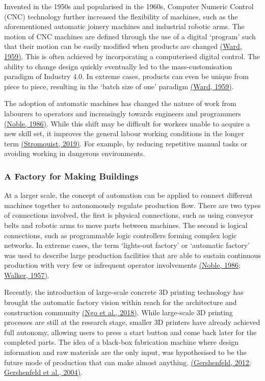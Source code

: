 \documentclass[11pt]{book}
\begin{document}
Invented in the 1950s and popularised in the 1960s, Computer Numeric Control (CNC) technology further increased the flexibility of machines, such as the aforementioned automatic joinery machines and industrial robotic arms. The motion of CNC machines are defined through the use of a digital ‘program’ such that their motion can be easily modified when products are changed \href{https://www.zotero.org/google-docs/?zaXN8V}{(Ward, 1959)}. This is often achieved by incorporating a computerised digital control. The ability to change design quickly eventually led to the mass-customisation paradigm of Industry 4.0. In extreme cases, products can even be unique from piece to piece, resulting in the ‘batch size of one’ paradigm \href{https://www.zotero.org/google-docs/?zgkMNk}{(Ward, 1959)}.

The adoption of automatic machines has changed the nature of work from labourers to operators and increasingly towards engineers and programmers \href{https://www.zotero.org/google-docs/?iYzGBf}{(Noble, 1986)}. While this shift may be difficult for workers unable to acquire a new skill set, it improves the general labour working conditions in the longer term \href{https://www.zotero.org/google-docs/?RBFbyp}{(Stromquist, 2019)}. For example, by reducing repetitive manual tasks or avoiding working in dangerous environments. 

\subsubsection{A Factory for Making Buildings}

At a larger scale, the concept of automation can be applied to connect different machines together to autonomously regulate production flow. There are two types of connections involved, the first is physical connections, such as using conveyor belts and robotic arms to move parts between machines. The second is logical connections, such as programmable logic controllers forming complex logic networks. In extreme cases, the term ‘lights-out factory’ or ‘automatic factory’ was used to describe large production facilities that are able to sustain continuous production with very few or infrequent operator involvements \href{https://www.zotero.org/google-docs/?1vGmg1}{(Noble, 1986; Walker, 1957)}. 

Recently, the introduction of large-scale concrete 3D printing technology has brought the automatic factory vision within reach for the architecture and construction community \href{https://www.zotero.org/google-docs/?rmNu2g}{(Ngo et al., 2018)}. While large-scale 3D printing processes are still at the research stage, smaller 3D printers have already achieved full autonomy, allowing users to press a start button and come back later for the completed parts. The idea of a black-box fabrication machine where design information and raw materials are the only input, was hypothesised to be the future mode of production that can make almost anything. \href{https://www.zotero.org/google-docs/?YpV7gl}{(Gershenfeld, 2012; Gershenfeld et al., 2004)}.  
\end{document}
